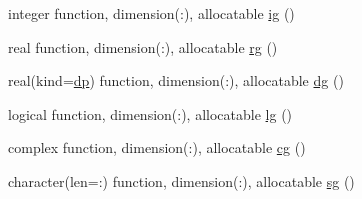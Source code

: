 \begin{DoxyCompactItemize}
\item 
integer function, dimension(\+:), allocatable \mbox{\hyperlink{namespacem__cli2_a11c3cc864e613c90b2a02c7409c00828}{ig}} ()
\item 
real function, dimension(\+:), allocatable \mbox{\hyperlink{namespacem__cli2_aff7a379ff1e7269001592f452ab017c8}{rg}} ()
\item 
real(kind=\mbox{\hyperlink{namespacem__cli2_acf83f1963cf6a56ad0221cfcf5402440}{dp}}) function, dimension(\+:), allocatable \mbox{\hyperlink{namespacem__cli2_a06ddc2533e5122b8f898bae7db0fea87}{dg}} ()
\item 
logical function, dimension(\+:), allocatable \mbox{\hyperlink{namespacem__cli2_aa1653cf1d6ce9739c1dcfdcb5361fa5f}{lg}} ()
\item 
complex function, dimension(\+:), allocatable \mbox{\hyperlink{namespacem__cli2_af45e2401f7c3c2309fe92882c1d5e521}{cg}} ()
\item 
character(len=\+:) function, dimension(\+:), allocatable \mbox{\hyperlink{namespacem__cli2_abc94b8f97a6056ea48ce48ab460bdf78}{sg}} ()
\end{DoxyCompactItemize}
